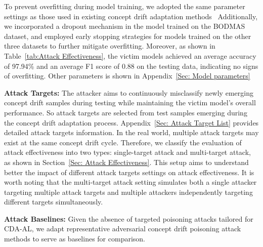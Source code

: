 \documentclass[lettersize,journal]{IEEEtran}
\begin{document}
To prevent overfitting during model training, we adopted the same parameter settings as those used in existing concept drift adaptation methods~\cite{2023-Usenix-chenyizhen}
Additionally, we incorporated a dropout mechanism in the model trained on the BODMAS dataset, and employed early stopping strategies for models trained on the other three datasets to further mitigate overfitting. 
Moreover, as shown in Table~\ref{tab:Attack Effectiveness}, the victim models achieved an average accuracy of 97.94\% and an average F1 score of 0.88 on the testing data, indicating no signs of overfitting.
Other parameters is shown in Appendix~\ref{Sec: Model parameters}

\textbf{Attack Targets:} 
The attacker aims to continuously misclassify newly emerging concept drift samples during testing while maintaining the victim model’s overall performance.
So attack targets are selected from test samples emerging during the concept drift adaptation process.
Appendix~\ref{Sec: Attack Target List} provides detailed attack targets information.
In the real world, multiple attack targets may exist at the same concept drift cycle.
Therefore, we classify the evaluation of attack effectiveness into two types: single-target attack and multi-target attack, as shown in Section~\ref{Sec: Attack Effectiveness}.
This setup aims to understand better the impact of different attack targets settings on attack effectiveness.
It is worth noting that the multi-target attack setting simulates both a single attacker targeting multiple attack targets and multiple attackers independently targeting different targets simultaneously.

\textbf{Attack Baselines:} Given the absence of targeted poisoning attacks tailored for CDA-AL, we adapt representative adversarial concept drift poisoning attack methods to serve as baselines for comparison.
\end{document}
